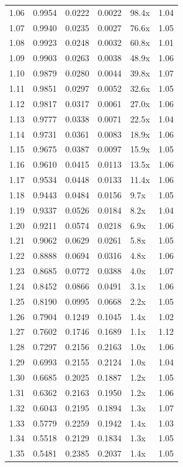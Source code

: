 \begin{tabular}{rrrrlr}
1.06 & 0.9954 & 0.0222 & 0.0022 & 98.4x & 1.04 \\
1.07 & 0.9940 & 0.0235 & 0.0027 & 76.6x & 1.05 \\
1.08 & 0.9923 & 0.0248 & 0.0032 & 60.8x & 1.01 \\
1.09 & 0.9903 & 0.0263 & 0.0038 & 48.9x & 1.06 \\
1.10 & 0.9879 & 0.0280 & 0.0044 & 39.8x & 1.07 \\
1.11 & 0.9851 & 0.0297 & 0.0052 & 32.6x & 1.05 \\
1.12 & 0.9817 & 0.0317 & 0.0061 & 27.0x & 1.06 \\
1.13 & 0.9777 & 0.0338 & 0.0071 & 22.5x & 1.04 \\
1.14 & 0.9731 & 0.0361 & 0.0083 & 18.9x & 1.06 \\
1.15 & 0.9675 & 0.0387 & 0.0097 & 15.9x & 1.05 \\
1.16 & 0.9610 & 0.0415 & 0.0113 & 13.5x & 1.06 \\
1.17 & 0.9534 & 0.0448 & 0.0133 & 11.4x & 1.06 \\
1.18 & 0.9443 & 0.0484 & 0.0156 & 9.7x & 1.05 \\
1.19 & 0.9337 & 0.0526 & 0.0184 & 8.2x & 1.04 \\
1.20 & 0.9211 & 0.0574 & 0.0218 & 6.9x & 1.06 \\
1.21 & 0.9062 & 0.0629 & 0.0261 & 5.8x & 1.05 \\
1.22 & 0.8888 & 0.0694 & 0.0316 & 4.8x & 1.06 \\
1.23 & 0.8685 & 0.0772 & 0.0388 & 4.0x & 1.07 \\
1.24 & 0.8452 & 0.0866 & 0.0491 & 3.1x & 1.06 \\
1.25 & 0.8190 & 0.0995 & 0.0668 & 2.2x & 1.05 \\
1.26 & 0.7904 & 0.1249 & 0.1045 & 1.4x & 1.02 \\
1.27 & 0.7602 & 0.1746 & 0.1689 & 1.1x & 1.12 \\
1.28 & 0.7297 & 0.2156 & 0.2163 & 1.0x & 1.06 \\
1.29 & 0.6993 & 0.2155 & 0.2124 & 1.0x & 1.04 \\
1.30 & 0.6685 & 0.2025 & 0.1887 & 1.2x & 1.05 \\
1.31 & 0.6362 & 0.2163 & 0.1950 & 1.2x & 1.06 \\
1.32 & 0.6043 & 0.2195 & 0.1894 & 1.3x & 1.07 \\
1.33 & 0.5779 & 0.2259 & 0.1942 & 1.4x & 1.03 \\
1.34 & 0.5518 & 0.2129 & 0.1834 & 1.3x & 1.05 \\
1.35 & 0.5481 & 0.2385 & 0.2037 & 1.4x & 1.05 \\

\end{tabular}
